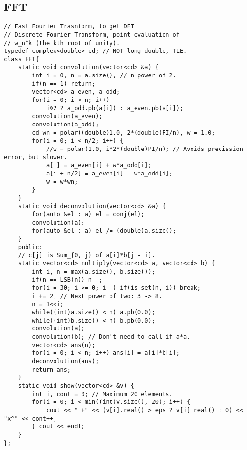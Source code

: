 \documentclass[a4paper]{article}
\begin{document}
\subsection*{FFT}
\begin{verbatim}
// Fast Fourier Trasnform, to get DFT
// Discrete Fourier Transform, point evaluation of
// w_n^k (the kth root of unity).
typedef complex<double> cd; // NOT long double, TLE.
class FFT{
    static void convolution(vector<cd> &a) {
        int i = 0, n = a.size(); // n power of 2.
        if(n == 1) return;
        vector<cd> a_even, a_odd;
        for(i = 0; i < n; i++)
            i%2 ? a_odd.pb(a[i]) : a_even.pb(a[i]);
        convolution(a_even);
        convolution(a_odd);
        cd wn = polar((double)1.0, 2*(double)PI/n), w = 1.0;
        for(i = 0; i < n/2; i++) {
            //w = polar(1.0, i*2*(double)PI/n); // Avoids precission error, but slower.
            a[i] = a_even[i] + w*a_odd[i];
            a[i + n/2] = a_even[i] - w*a_odd[i];
            w = w*wn;
        }
    }
    static void deconvolution(vector<cd> &a) {
        for(auto &el : a) el = conj(el); 
        convolution(a);
        for(auto &el : a) el /= (double)a.size();
    }
    public:
    // c[j] is Sum_{0, j} of a[i]*b[j - i].
    static vector<cd> multiply(vector<cd> a, vector<cd> b) {
        int i, n = max(a.size(), b.size());
        if(n == LSB(n)) n--;
        for(i = 30; i >= 0; i--) if(is_set(n, i)) break;
        i += 2; // Next power of two: 3 -> 8.
        n = 1<<i;
        while((int)a.size() < n) a.pb(0.0);
        while((int)b.size() < n) b.pb(0.0);
        convolution(a);
        convolution(b); // Don't need to call if a*a.
        vector<cd> ans(n);
        for(i = 0; i < n; i++) ans[i] = a[i]*b[i];
        deconvolution(ans);
        return ans;
    }
    static void show(vector<cd> &v) {
        int i, cont = 0; // Maximum 20 elements.
        for(i = 0; i < min((int)v.size(), 20); i++) {
            cout << " +" << (v[i].real() > eps ? v[i].real() : 0) << "x^" << cont++;
        } cout << endl;
    }
};
\end{verbatim}
\end{document}
